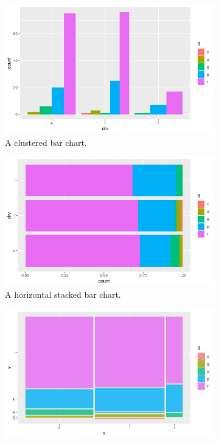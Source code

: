 \begin{figure}
  \begin{subfigure}{.33\textwidth}
    \centering
    \includegraphics[width=\textwidth]{img/bivar-clustered-bar-chart}
    \caption{A clustered bar chart.}
    \label{fig:clustered-bar-chart}
  \end{subfigure}
  \begin{subfigure}{.33\textwidth}
    \centering
    \includegraphics[width=\textwidth]{img/bivar-horizontal-stacked-bar-chart}
    \caption{A horizontal stacked bar chart.}
    \label{fig:stacked-bar-chart}
  \end{subfigure}
  \begin{subfigure}{.33\textwidth}
    \centering
    \includegraphics[width=\textwidth]{img/bivar-mosaic-plot}

\end{subfigure}
\end{figure}
